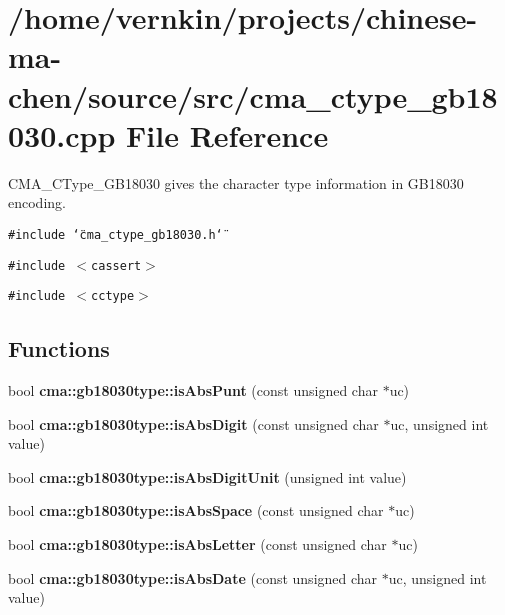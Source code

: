\section{/home/vernkin/projects/chinese-ma-chen/source/src/cma\_\-ctype\_\-gb18030.cpp File Reference}
\label{cma__ctype__gb18030_8cpp}
CMA\_\-CType\_\-GB18030 gives the character type information in GB18030 encoding.  


{\tt \#include \char`\"{}cma\_\-ctype\_\-gb18030.h\char`\"{}}\par
{\tt \#include $<$cassert$>$}\par
{\tt \#include $<$cctype$>$}\par
\subsection*{Functions}
\begin{CompactItemize}
\item 
bool {\bf cma::gb18030type::isAbsPunt} (const unsigned char $\ast$uc)
\item 
bool {\bf cma::gb18030type::isAbsDigit} (const unsigned char $\ast$uc, unsigned int value)
\item 
bool \textbf{cma::gb18030type::isAbsDigitUnit} (unsigned int value)\label{namespacecma_1_1gb18030type_9d7cf1c182cc8c70085b21162ca74a47}

\item 
bool {\bf cma::gb18030type::isAbsSpace} (const unsigned char $\ast$uc)
\item 
bool {\bf cma::gb18030type::isAbsLetter} (const unsigned char $\ast$uc)
\item 
bool {\bf cma::gb18030type::isAbsDate} (const unsigned char $\ast$uc, unsigned int value)
\end{CompactItemize}
